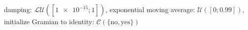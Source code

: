 damping: $\mathcal{LU}([\num[scientific-notation=true]{1e-15}; \num[scientific-notation=false]{1}])$, exponential moving average: $\mathcal{U}([\num[scientific-notation=false]{0}; \num[scientific-notation=true]{0.99}])$, initialize Gramian to identity: $\mathcal{C}(\{\text{no},\text{yes}\})$